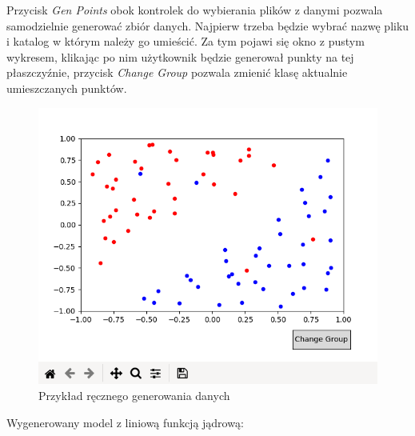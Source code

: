 \documentclass[paper=a4, fontsize=11pt]{scrartcl} %
\numberwithin{equation}{section} %
\numberwithin{figure}{section} %
\begin{document}
    \par Przycisk \textit{Gen Points} obok kontrolek do wybierania plików z danymi pozwala
    samodzielnie generować zbiór danych. Najpierw trzeba będzie wybrać nazwę pliku i katalog w
    którym należy go umieścić. Za tym pojawi się okno z pustym wykresem, klikając po nim
    użytkownik będzie generował punkty na tej płaszczyźnie, przycisk \textit{Change Group}
    pozwala zmienić klasę aktualnie umieszczanych punktów.

    \begin{figure}[H]
        \begin{center}
            \includegraphics[scale=0.55]{./img/gen_plot.png}
            \caption{Przykład ręcznego generowania danych}
            \label{fig:gen_plot}
        \end{center}
    \end{figure}

    \par Wygenerowany model z liniową funkcją jądrową:
\end{document}
